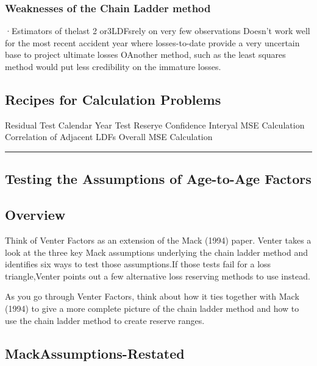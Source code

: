 \documentclass[
]{article}
\begin{document}
\subsubsection{Weaknesses of the Chain Ladder
method}\label{weaknesses-of-the-chain-ladder-method}

·Estimators of thelast 2 or3LDFsrely on very few observations Doesn't
work well for the most recent accident year where losses-to-date provide
a very uncertain base to project ultimate losses OAnother method, such
as the least squares method would put less credibility on the immature
losses.

\subsection{Recipes for Calculation
Problems}\label{recipes-for-calculation-problems-4}

Residual Test Calendar Year Test Reserye Confidence Interyal MSE
Calculation Correlation of Adjacent LDFs Overall MSE Calculation

\begin{center}\rule{0.5\linewidth}{0.5pt}\end{center}

\subsection{Testing the Assumptions of Age-to-Age
Factors}\label{testing-the-assumptions-of-age-to-age-factors}

\subsection{Overview}\label{overview-5}

Think of Venter Factors as an extension of the Mack (1994) paper. Venter
takes a look at the three key Mack assumptions underlying the chain
ladder method and identifies six ways to test those assumptions.If those
tests fail for a loss triangle,Venter points out a few alternative loss
reserving methods to use instead.

As you go through Venter Factors, think about how it ties together with
Mack (1994) to give a more complete picture of the chain ladder method
and how to use the chain ladder method to create reserve ranges.

\subsection{MackAssumptions-Restated}\label{mackassumptions-restated}
\end{document}
